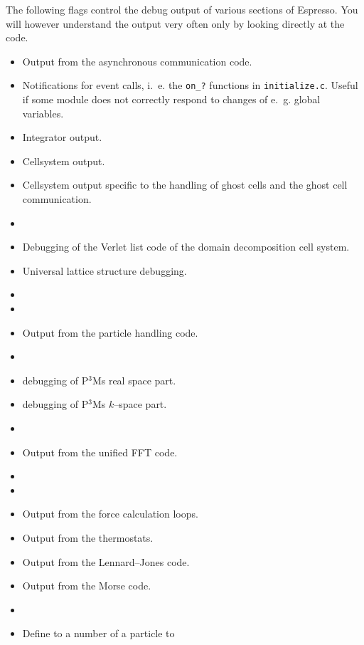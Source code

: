 The following flags control the debug output of various sections of
Espresso. You will however understand the output very often only by
looking directly at the code.
\begin{itemize}
\item {} Output from the asynchronous communication code.
\item {} Notifications for event calls, i.~e. the
  \texttt{on\_?} functions in \texttt{initialize.c}. Useful if some
  module does not correctly respond to changes of e.~g.  global
  variables.
\item {} Integrator output.
\item {} Cellsystem output.
\item {} Cellsystem output specific to the
  handling of ghost cells and the ghost cell communication.
\item {}
\item {} Debugging of the Verlet list code of the
  domain decomposition cell system.
\item {} Universal lattice structure debugging.
\item {}
\item {}
\item {} Output from the particle handling code.
\item {}
\item {} debugging of P$^3$Ms real space part.
\item {} debugging of P$^3$Ms $k$--space part.
\item {}
\item {} Output from the unified FFT code.
\item {}
\item {}
\item {} Output from the force calculation loops.
\item {} Output from the thermostats.
\item {} Output from the Lennard--Jones code.
\item {} Output from the Morse code.
\item {}
\item {} Define to a number of a particle to

\end{itemize}
